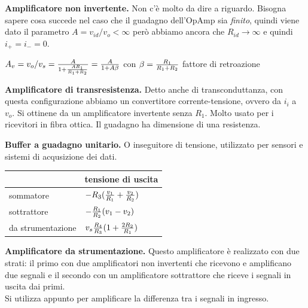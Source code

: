 \documentclass[a4paper,portrait,12pt]{article}
\theoremstyle{definition}
\begin{document}
\textbf{Amplificatore non invertente.} Non c'è molto da dire a riguardo. Bisogna sapere cosa succede nel 
caso che il guadagno dell'OpAmp sia \textit{finito}, quindi viene dato il parametro $A = v_{id} / v_o < 
\infty$ però abbiamo ancora che $R_{id} \to \infty$ e quindi $i_+ = i_- = 0$.
\begin{center}
$A_v = v_o / v_s = {A \over 1 + {A R_1 \over R_1 + R_2}} = {A \over 1 + A\beta}$ con $\beta = {R_1 
\over R_1 + R_2}$ fattore di retroazione
\end{center}

\textbf{Amplificatore di transresistenza.} Detto anche di transconduttanza, con questa configurazione abbiamo 
un convertitore corrente-tensione, ovvero da $i_i$ a $v_o$. Si ottinene da un amplificatore invertente 
senza $R_1$. Molto usato per i ricevitori in fibra ottica. Il guadagno ha dimensione di una resistenza.
\bigskip

\textbf{Buffer a guadagno unitario.} O inseguitore di tensione, utilizzato per sensori e sistemi di 
acqusizione dei dati.

\begin{table}[H]
\begin{center}
\begin{tabular}{|l|l|}
\hline
\hline & tensione di uscita\\
\hline
\hline \rule[-4mm]{0mm}{1cm} sommatore & $ -R_3({v_1 \over R_1} + {v_2 \over R_2})$\\
\hline \rule[-4mm]{0mm}{1cm} sottrattore & $ -{R_1 \over R_2}(v_1-v_2)$\\
\hline \rule[-4mm]{0mm}{1cm} da strumentazione & $ v_s{R_4 \over R_3}(1 + {2R_2 \over R_1})$\\
\hline
\end{tabular}
\end{center}
\end{table}

\textbf{Amplificatore da strumentazione.} Questo amplificatore è realizzato con due strati: il primo con 
due amplificatori non invertenti che ricevono e amplificano due segnali e il secondo con un amplificatore 
sottrattore che riceve i segnali in uscita dai primi.\\
Si utilizza appunto per amplificare la differenza tra i segnali in ingresso.
\end{document}
